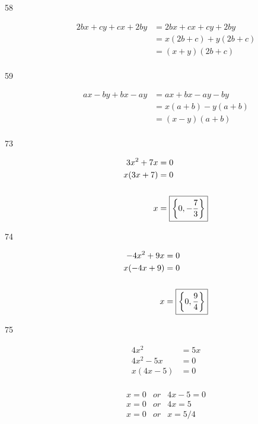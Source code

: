 \documentclass[letterpaper]{exam}
\begin{document}
\begin{description}
      \item[58]
      \begin{align*}
        2bx + cy + cx + 2by & = 2bx + cx + cy + 2by \\
                            & = x(2b + c) + y(2b + c) \\
                            & = \boxed{ (x + y)(2b + c) } \\
      \end{align*}

      \item[59]
        \begin{align*}
          ax - by + bx - ay & = ax + bx -ay - by \\
                            & = x(a + b) - y(a + b) \\
                            & = \boxed{ (x - y)(a + b) } \\
        \end{align*}

      \item[73]
        \begin{align*}
          3x^2 + 7x & = 0 \\
          x(3x + 7) & = 0 \\
          \\
          x         & = \boxed{ \cbr{ 0, - \frac{7}{3} } } \\
        \end{align*}

      \item[74]
        \begin{align*}
          -4x^2 + 9x & = 0 \\
          x(-4x + 9) & = 0 \\
          \\
          x          & = \boxed{ \cbr{ 0, \frac{9}{4} } } \\
        \end{align*}

      \item[75]
      \begin{align*}
        4x^2 &= 5x \\
        4x^2 - 5x &= 0 \\
        x(4x - 5) &= 0 \\
      \end{align*}

      \begin{align*}
        x = 0 &or& 4x - 5 = 0 \\
        x = 0 &or& 4x = 5 \\
        x = 0 &or& x = 5/4 \\
      \end{align*}


\end{description}
\end{document}
